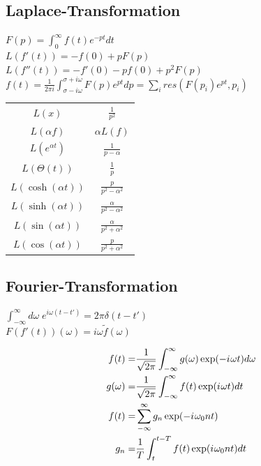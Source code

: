 \documentclass[12pt,a4paper, twoside]{article}
\newcommand{\iu}{{i\mkern1mu}}
\renewcommand{\=}[1]{\stackrel{#1}{=}}
\theoremstyle{definition}
\theoremstyle{remark}
\begin{document}
\begin{center}
\begin{minipage}[t]{.6\linewidth}
\vspace{0pt}

\subsection{Laplace-Transformation}
$F(p) = \int_0^{\infty} f(t) e^{-pt}dt$\\
$L(f'(t)) = -f(0) + p F(p)$\\
$L(f''(t)) = - f'(0) - p f(0) + p^2 F(p)$\\
$f(t) = \frac{1}{2\pi i}\int_{\sigma - i \omega}^{\sigma + i \omega} F(p) e^{pt}dp = \sum_i res (F(p_i) e^{pt}, p_i)$\\

\setlength\tabcolsep{2.5pt}
\noindent\begin{tabular}{cc}
$L(x)$ & $\frac{1}{p^2}$\\
$L(\alpha f)$ & $\alpha L(f)$\\
$L(e^{\alpha t})$ & $\frac{1}{p-\alpha}$\\
$L(\Theta(t))$ & $\frac{1}{p}$\\
$L(\cosh(\alpha t))$ & $\frac{p}{p^2 - \alpha^2}$\\
$L(\sinh(\alpha t))$ & $\frac{\alpha}{p^2 - \alpha^2}$\\
$L(\sin(\alpha t))$ & $\frac{\alpha}{p^2 + \alpha^2}$\\
$L(\cos(\alpha t))$ & $\frac{p}{p^2 + \alpha^2}$
\end{tabular}





\end{minipage}%
\begin{minipage}[t]{.4\linewidth}
\vspace{0pt}
\subsection{Fourier-Transformation}

$\int_{-\infty}^{\infty} d\omega \; e^{i\omega (t - t')} = 2\pi \delta(t-t')$\\
$F(f'(t))(\omega) = i\omega \tilde f(\omega)$

\begin{framed}
\begin{align*}
f(t) =& \frac{1}{\sqrt{2\pi}} \int_{-\infty}^{\infty} g(\omega) \exp(-\iu \omega t) d\omega\\
g(\omega) =& \frac{1}{\sqrt{2\pi}} \int_{-\infty}^{\infty} f(t) \exp (\iu \omega t) dt\\
f(t) =& \sum_{-\infty}^{\infty} g_n \exp(- \iu \omega_0 n t)\\
g_n =& \frac{1}{T} \int_{t}^{t-T} f(t) \exp(\iu \omega_0 n t) dt
\end{align*}
\end{framed}

\end{minipage}
\end{center}
\end{document}
